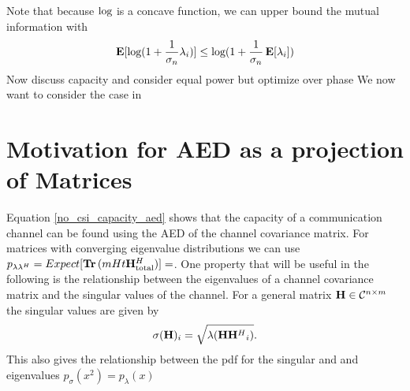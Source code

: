 \documentclass[12pt,a4paper]{report}
\begin{document}
Note that because $\text{log{}}$ is a concave function, we can upper bound the mutual information with
\begin{equation}\label{mut_inf}
\mathop{\bf E{}}[\text{log{}}(1 + \frac{1}{\sigma_n}\lambda_i)] \leq \text{log{}}(1 + \frac{1}{\sigma_n}\mathop{\bf E{}}[\lambda_i])
\end{equation}
Now discuss capacity and consider equal power but optimize over phase
We now want to consider the case in 

\section{Motivation for AED as a projection of Matrices}
Equation \ref{no_csi_capacity_aed} shows that the capacity of a communication channel can be found using the AED of the channel covariance matrix.
For matrices with converging eigenvalue distributions we can use $p_{\lambda\lambda^H} = Expect[\mathop{\bf Tr}{(mHt \mathbf{H}_\text{total}^H})] = $.
One property that will be useful in the following is the relationship between the eigenvalues of a channel covariance matrix and the singular values of
the channel.
For a general matrix $\mathbf{H} \in \mathcal{C}^{n \times m}$ the singular values are given by 
\begin{equation}\label{sigular_eigen}
\sigma(\mathbf{H})_i = \sqrt{\lambda({\mathbf{H}\mathbf{H}^H}_i)}.
\end{equation}
This also gives the relationship between the pdf for the singular and and eigenvalues $p_{\sigma}(x^2) = p_{\lambda}(x)$
\end{document}
